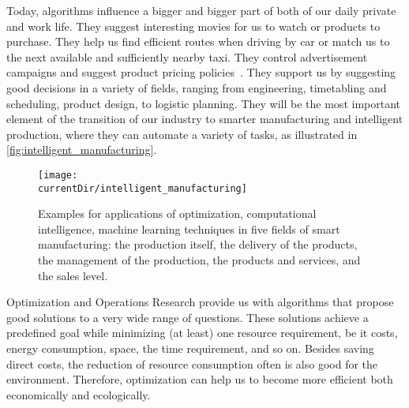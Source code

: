 \hsection{}%
%
%
Today, algorithms influence a bigger and bigger part of both of our daily private and work life.
They suggest interesting movies for us to watch or products to purchase.
They help us find efficient routes when driving by car or match us to the next available and sufficiently nearby taxi.
They control advertisement campaigns and suggest product pricing policies~\cite{MAM2021TROAIRWAFRAMG}.
They support us by suggesting good decisions in a variety of fields, ranging from engineering, timetabling and scheduling, product design, to logistic planning.
They will be the most important element of the transition of our industry to smarter manufacturing and intelligent production, where they can automate a variety of tasks, as illustrated in \autoref{fig:intelligent_manufacturing}.

\begin{figure}%
\centering%
\texttt{[image: \\currentDir/intelligent\_manufacturing]}%
\caption{%
Examples for applications of optimization, computational intelligence, machine learning techniques in five fields of smart manufacturing: the production itself, the delivery of the products, the management of the production, the products and services, and the sales level.}%
\label{fig:intelligent_manufacturing}%
\end{figure}%

Optimization and Operations Research provide us with algorithms that propose good solutions to a very wide range of questions.
These solutions achieve a predefined goal while minimizing (at least) one resource requirement, be it costs, energy consumption, space, the time requirement, and so on.
Besides saving direct costs, the reduction of resource consumption often is also good for the environment.
Therefore, optimization can help us to become more efficient both economically and ecologically.


